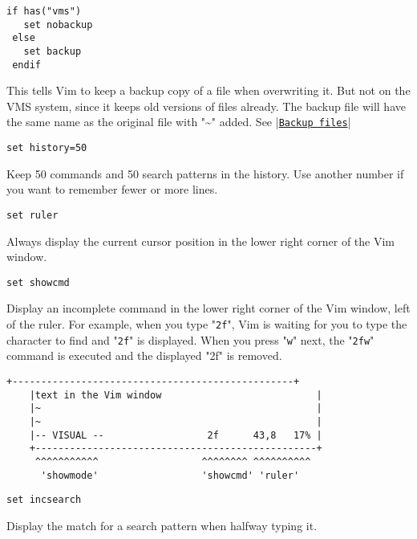 \begin{Verbatim}[samepage=true]
 if has("vms")
   set nobackup
 else
   set backup
 endif
 \end{Verbatim}

This tells Vim to keep a backup copy of a file when overwriting it.
But not on the VMS system, since it keeps old versions of files already.
The backup file will have the same name as the original file with "\textasciitilde" added.
See |\hyperref[Backup files]{\texttt{Backup files}}|

 \begin{Verbatim}[samepage=true]
 set history=50
 \end{Verbatim}

Keep 50 commands and 50 search patterns in the history.
Use another number if you want to remember fewer or more lines.

 \begin{Verbatim}[samepage=true]
 set ruler
 \end{Verbatim}

Always display the current cursor position in the lower right corner of the Vim window.

 \begin{Verbatim}[samepage=true]
 set showcmd
 \end{Verbatim}

Display an incomplete command in the lower right corner of the Vim window, left of the ruler.
For example, when you type "\verb!2f!", Vim is waiting for you to type the character to find and "\verb!2f!" is displayed.
When you press "\verb!w!" next, the "\verb!2fw!" command is executed and the displayed "2f" is removed.

\begin{Verbatim}[samepage=true]
    +-------------------------------------------------+
    |text in the Vim window                           |
    |~                                                |
    |~                                                |
    |-- VISUAL --                  2f      43,8   17% |
    +-------------------------------------------------+
     ^^^^^^^^^^^                  ^^^^^^^^ ^^^^^^^^^^
      'showmode'                  'showcmd' 'ruler'
\end{Verbatim}

\begin{Verbatim}[samepage=true]
 set incsearch
\end{Verbatim}

Display the match for a search pattern when halfway typing it.

